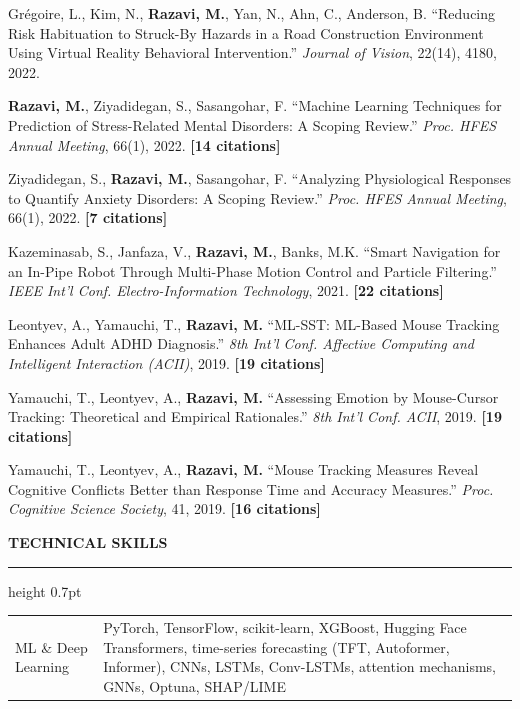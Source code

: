 \documentclass[11pt,letterpaper]{article}
\makeatletter
\newcommand{\cvsection}[1]{%
  \vspace{0.7em}%
  {\color{headerblue}\large\bfseries\MakeUppercase{#1}}%
  \vspace{0.12em}%
  {\color{rulecolor}\hrule height 0.7pt}%
  \vspace{0.35em}%
}
\newcommand{\cvskillrow}[2]{%
  \noindent\begin{tabularx}{\textwidth}{@{}>{\color{headerblue}\bfseries\raggedright}p{4.2cm} X@{}}
    #1 & {\color{darktext}#2}\\
  \end{tabularx}\vspace{0.08em}%
}
\makeatother
\begin{document}
{\color{darktext}\small
\begin{etaremune}[leftmargin=0.6cm, itemsep=0.12cm, topsep=0.08cm]

\item Gr\'{e}goire, L., Kim, N., \textbf{Razavi, M.}, Yan, N., Ahn, C., Anderson, B. ``Reducing Risk Habituation to Struck-By Hazards in a Road Construction Environment Using Virtual Reality Behavioral Intervention.'' \textit{Journal of Vision}, 22(14), 4180, 2022.

\item \textbf{Razavi, M.}, Ziyadidegan, S., Sasangohar, F. ``Machine Learning Techniques for Prediction of Stress-Related Mental Disorders: A Scoping Review.'' \textit{Proc. HFES Annual Meeting}, 66(1), 2022. \textbf{[14 citations]}

\item Ziyadidegan, S., \textbf{Razavi, M.}, Sasangohar, F. ``Analyzing Physiological Responses to Quantify Anxiety Disorders: A Scoping Review.'' \textit{Proc. HFES Annual Meeting}, 66(1), 2022. \textbf{[7 citations]}

\item Kazeminasab, S., Janfaza, V., \textbf{Razavi, M.}, Banks, M.K. ``Smart Navigation for an In-Pipe Robot Through Multi-Phase Motion Control and Particle Filtering.'' \textit{IEEE Int'l Conf. Electro-Information Technology}, 2021. \textbf{[22 citations]}

\item Leontyev, A., Yamauchi, T., \textbf{Razavi, M.} ``ML-SST: ML-Based Mouse Tracking Enhances Adult ADHD Diagnosis.'' \textit{8th Int'l Conf. Affective Computing and Intelligent Interaction (ACII)}, 2019. \textbf{[19 citations]}

\item Yamauchi, T., Leontyev, A., \textbf{Razavi, M.} ``Assessing Emotion by Mouse-Cursor Tracking: Theoretical and Empirical Rationales.'' \textit{8th Int'l Conf. ACII}, 2019. \textbf{[19 citations]}

\item Yamauchi, T., Leontyev, A., \textbf{Razavi, M.} ``Mouse Tracking Measures Reveal Cognitive Conflicts Better than Response Time and Accuracy Measures.'' \textit{Proc. Cognitive Science Society}, 41, 2019. \textbf{[16 citations]}

\end{etaremune}
}

\cvsection{Technical Skills}

\cvskillrow{ML \& Deep Learning}{PyTorch, TensorFlow, scikit-learn, XGBoost, Hugging Face Transformers, time-series forecasting (TFT, Autoformer, Informer), CNNs, LSTMs, Conv-LSTMs, attention mechanisms, GNNs, Optuna, SHAP/LIME}
\end{document}
